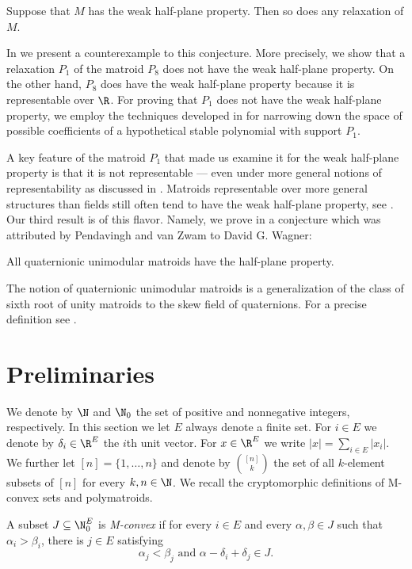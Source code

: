 \begin{con*}
    Suppose that $M$ has the weak half-plane property. Then so does any relaxation of $M$.
\end{con*}

In  we present a counterexample to this conjecture. More precisely, we show that a relaxation $P_1$ of the matroid $P_8$ does not have the weak half-plane property. On the other hand, $P_8$ does have the weak half-plane property because it is representable over $\R$. For proving that $P_1$ does not have the weak half-plane property, we employ the techniques developed in \cite{BrandenDLeon} for narrowing down the space of possible coefficients of a hypothetical stable polynomial with support $P_1$.

A key feature of the matroid $P_1$ that made us examine it for the weak half-plane property is that it is not representable --- even under more general notions of representability as discussed in \cite{skewpartial}. Matroids representable over more general structures than fields still often tend to have the weak half-plane property, see \eg \cite{NonPappus}. Our third result is of this flavor. Namely, we prove in  a conjecture which was attributed by Pendavingh and van Zwam to David G. Wagner:

\begin{con*}
    All quaternionic unimodular matroids have the half-plane property.
\end{con*}

The notion of quaternionic unimodular matroids is a generalization of the class of sixth root of unity matroids to the skew field of quaternions. For a precise definition see .

\section{Preliminaries}
We denote by $\N$ and $\N_0$ the set of positive and nonnegative integers, respectively.
In this section we let $E$ always denote a finite set. For $i\in E$ we denote by $\delta_i\in\R^E$ the $i$th unit vector. For $x\in\R^E$ we write $|x|=\sum_{i\in E}|x_i|$. We further let $[n]=\{1,\ldots,n\}$ and denote by $\binom{[n]}{k}$ the set of all $k$-element subsets of $[n]$ for every $k,n\in\N$. We recall the cryptomorphic definitions of M-convex sets and polymatroids.

\begin{Def}
     A subset $J\subseteq\N_0^E$ is \emph{M-convex} if for every $i\in E$ and every $\alpha,\beta\in J$ such that $\alpha_i>\beta_i$, there is $j\in E$ satisfying
            \begin{equation*}
                \alpha_j<\beta_j\textrm{ and }\alpha-\delta_i+\delta_j\in J.
            \end{equation*}
\end{Def}

